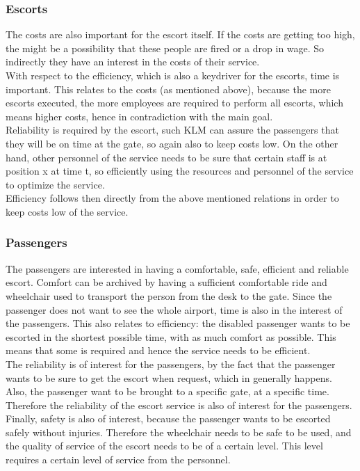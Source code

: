 \documentclass[a4paper, 12pt, notitlepage]{report}
\begin{document}
\subsubsection{Escorts}
The costs are also important for the escort itself. If the costs are getting too high, the might be a possibility that these people are fired or a drop in wage. So indirectly they have an interest in the costs of their service.\\
With respect to the efficiency, which is also a keydriver for the escorts, time is important. This relates to the costs (as mentioned above), because the more escorts executed, the more employees are required to perform all escorts, which means higher costs, hence in contradiction with the main goal. \\
Reliability is required by the escort, such KLM can assure the passengers that they will be on time at the gate, so again also to keep costs low. On the other hand, other personnel of the service needs to be sure that certain staff is at position x at time t, so efficiently using the resources and personnel of the service to optimize the service.\\
Efficiency follows then directly from the above mentioned relations in order to keep costs low of the service.
\subsubsection{Passengers}
The passengers are interested in having a comfortable, safe, efficient and reliable escort. Comfort can be archived by having a sufficient comfortable ride and wheelchair used to transport the person from the desk to the gate. Since the passenger does not want to see the whole airport,  time is also in the interest of the passengers. This also relates to efficiency: the disabled passenger wants to be escorted in the shortest possible time, with as much comfort as possible. This means that some  is required and hence the service needs to be efficient. \\
The reliability is of interest for the passengers, by the fact that
the passenger wants to be sure to get the escort when request, which in generally happens. Also, the passenger want to be brought to a specific gate, at a specific time. Therefore the reliability of the escort service is also of interest for the passengers.\\
Finally, safety is also of interest, because the passenger wants to be escorted safely without injuries. Therefore the wheelchair needs to be safe to be used, and the quality of service of the escort needs to be of a certain level. This level requires a certain level of service from the personnel.
\end{document}
